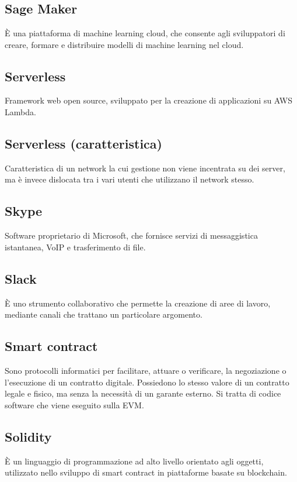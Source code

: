 \section{}
	\subsection*{Sage Maker}
	È una piattaforma di machine learning cloud, che consente agli sviluppatori di creare, formare e distribuire modelli di machine learning nel cloud.
	\subsection*{Serverless}
	Framework web open source, sviluppato per la creazione di applicazioni su AWS Lambda.
	\subsection*{Serverless (caratteristica)}
	Caratteristica di un network la cui gestione non viene incentrata su dei server, ma è invece dislocata tra i vari utenti che utilizzano il network stesso.
	\subsection*{Skype}
	Software proprietario di Microsoft, che fornisce servizi di messaggistica istantanea, VoIP e trasferimento di file.
	\subsection*{Slack}
	È uno strumento collaborativo che permette la creazione di aree di lavoro, mediante canali che trattano un particolare argomento.
	\subsection*{Smart contract}
	Sono protocolli informatici per facilitare, attuare o verificare, la negoziazione o l’esecuzione di un contratto digitale. Possiedono lo stesso valore di un contratto legale e fisico, ma senza la necessità di un garante esterno. Si tratta di codice software che viene eseguito sulla EVM.
	\subsection*{Solidity}
	È un linguaggio di programmazione ad alto livello orientato agli oggetti, utilizzato nello sviluppo di smart contract in piattaforme basate su blockchain.
